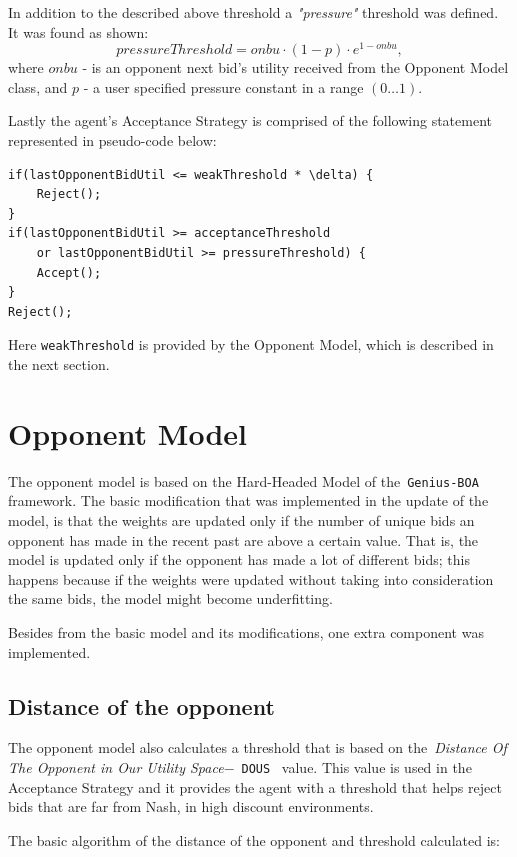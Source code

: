 \documentclass[html]{report}    %
\begin{document}
In addition to the described above threshold a \textit{"pressure"} threshold was defined. It was found as shown:
\begin{dmath} \label{7}	
	pressureThreshold = onbu\cdot(1 - p)\cdot e^{1 - onbu},
\end{dmath}
where $onbu$ - is an opponent next bid's utility received from the Opponent Model class, and $p$ - a user specified pressure constant in a range $(0\dots1)$.

Lastly the agent's Acceptance Strategy is comprised of the following statement represented in pseudo-code below:
\begin{verbatim}
if(lastOpponentBidUtil <= weakThreshold * \delta) {
    Reject();
}
if(lastOpponentBidUtil >= acceptanceThreshold
    or lastOpponentBidUtil >= pressureThreshold) {
    Accept();
}
Reject();
\end{verbatim}
Here \texttt{weakThreshold} is provided by the Opponent Model, which is described in the next section.

\section{Opponent Model}  

The opponent model is based on the Hard-Headed Model of the~\texttt{Genius-BOA} framework. The basic modification that was implemented in the update of the model, is that the weights are updated only if the number of unique bids an opponent has made in the recent past are above a certain value. That is, the model is updated only if the opponent has made a lot of different bids; this happens because if the weights were updated without taking into consideration the same bids, the model might become underfitting.

Besides from the basic model and its modifications, one extra component was implemented.~\cite{anac2013}

\subsection{Distance of the opponent}

The opponent model also calculates a threshold that is based on the~\textit{Distance Of The Opponent in Our Utility Space}$-$~\texttt{DOUS}~\cite{anac2013} value. This value is used in the Acceptance Strategy and it provides the agent with a threshold that helps reject bids that are far from Nash, in high discount environments.

The basic algorithm of the distance of the opponent and threshold calculated is:
\end{document}
